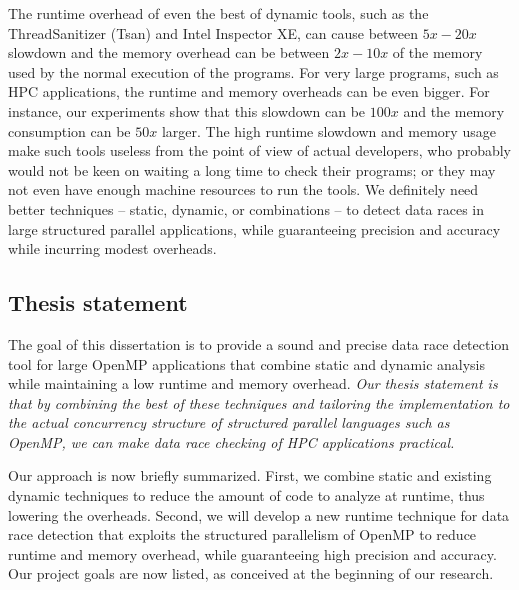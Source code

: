 The runtime overhead of even the best of dynamic tools, such as the
ThreadSanitizer (Tsan) and Intel Inspector XE, can cause between $5x-20x$
slowdown and the memory overhead can be between $2x-10x$ of the memory used by
the normal execution of the programs.
%
For very large programs, such as HPC applications, the runtime and memory
overheads can be even bigger.
%
For instance, our experiments show that this slowdown can be $100x$
and the memory consumption can be $50x$ larger.
%
The high runtime slowdown and memory usage make such tools useless from the
point of view of actual developers, who probably would not be keen on waiting
a long time to check their programs; or they may not even have enough machine
resources to run the tools.
%
We definitely need better techniques -- static, dynamic, or combinations -- to
detect data races in large structured parallel applications, while
guaranteeing precision and accuracy while incurring modest overheads.

\subsection{Thesis statement}
\label{subsec:statement}

The goal of this dissertation is to provide a sound and precise data race
detection tool for large OpenMP applications that combine static and dynamic
analysis while maintaining a low runtime and memory overhead.
% 
\emph{Our thesis statement is that by combining the best of these techniques
  and tailoring the implementation to the actual concurrency structure of
  structured parallel languages such as OpenMP, we can make data race checking
  of HPC applications practical.}

Our approach is now briefly summarized.
%
First, we combine static and existing dynamic techniques to reduce the amount
of code to analyze at runtime, thus lowering the overheads.
%
Second, we will develop a new runtime technique for data race detection that
exploits the structured parallelism of OpenMP to reduce runtime and memory
overhead, while guaranteeing high precision and accuracy.
%
Our project goals are now listed, as conceived at the beginning of our
research.

